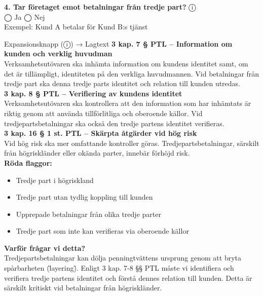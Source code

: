 \documentclass[10pt]{beamer}
\begin{document}
\begin{frame}[label=riskfragor-steg3]
  \textbf{4. Tar företaget emot betalningar från tredje part?} \hspace{0.3cm} ⓘ\\
  ◯ Ja \hspace{0.5cm} ◯ Nej\\
  \tiny Exempel: Kund A betalar för Kund B:s tjänst
  \begin{alertblock}{Expansionsknapp (ⓘ) → Lagtext}
    \tiny \textbf{3 kap. 7 § PTL – Information om kunden och verklig huvudman}\\
    \tiny Verksamhetsutövaren ska inhämta information om kundens identitet samt, om det är tillämpligt, identiteten på den verkliga huvudmannen. Vid betalningar från tredje part ska denna tredje parts identitet och relation till kunden utredas.\\[0.1cm]
    \tiny \textbf{3 kap. 8 § PTL – Verifiering av kundens identitet}\\
    \tiny Verksamhetsutövaren ska kontrollera att den information som har inhämtats är riktig genom att använda tillförlitliga och oberoende källor. Vid tredjepartsbetalningar ska också den tredje partens identitet verifieras.\\[0.1cm]
    \tiny \textbf{3 kap. 16 § 1 st. PTL – Skärpta åtgärder vid hög risk}\\
    \tiny Vid hög risk ska mer omfattande kontroller göras. Tredjepartsbetalningar, särskilt från högriskländer eller okända parter, innebär förhöjd risk.\\[0.1cm]
    \tiny \textbf{Röda flaggor:}\\
    \begin{itemize}
      \item Tredje part i högriskland
      \item Tredje part utan tydlig koppling till kunden
      \item Upprepade betalningar från olika tredje parter
      \item Tredje part som inte kan verifieras via oberoende källor
    \end{itemize}
    \vspace{0.1cm}
    \tiny \textbf{Varför frågar vi detta?}\\
    \tiny Tredjepartsbetalningar kan dölja penningtvättens ursprung genom att bryta spårbarheten (\"layering\"). Enligt 3 kap. 7-8 §§ PTL måste vi identifiera och verifiera tredje partens identitet och förstå dennes relation till kunden. Detta är särskilt kritiskt vid betalningar från högriskländer.
  \end{alertblock}


\end{frame}
\end{document}

